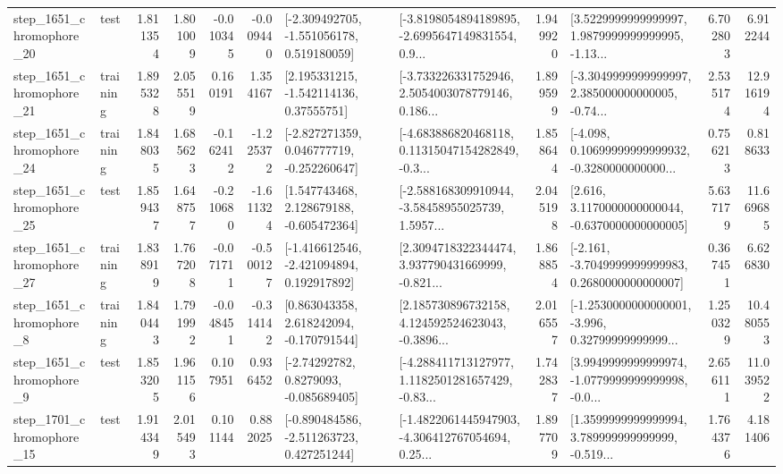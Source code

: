 \begin{tabular}{llrrrrllrlrr}
 step\_1651\_chromophore\_20 &      test &      1.811354 &    1.801009 &     -0.010345 & -0.009440 &   [-2.309492705, -1.551056178, 0.519180059] &  [-3.8198054894189895, -2.6995647149831554, 0.9... &       1.949920 &  [3.5229999999999997, 1.9879999999999995, -1.13... &            6.702803 &          6.912244 \\
 step\_1651\_chromophore\_21 &  training &      1.895328 &    2.055519 &      0.160191 &  1.354167 &     [2.195331215, -1.542114136, 0.37555751] &  [-3.733226331752946, 2.5054003078779146, 0.186... &       1.899599 &  [-3.3049999999999997, 2.385000000000005, -0.74... &            2.535174 &         12.916194 \\
 step\_1651\_chromophore\_24 &  training &      1.848035 &    1.685623 &     -0.162412 & -1.225372 &   [-2.827271359, 0.046777719, -0.252260647] &  [-4.683886820468118, 0.11315047154282849, -0.3... &       1.858644 &  [-4.098, 0.10699999999999932, -0.3280000000000... &            0.756213 &          0.818633 \\
 step\_1651\_chromophore\_25 &      test &      1.859437 &    1.648757 &     -0.210680 & -1.611324 &    [1.547743468, 2.128679188, -0.605472364] &  [-2.588168309910944, -3.58458955025739, 1.5957... &       2.045198 &   [2.616, 3.1170000000000044, -0.6370000000000005] &            5.637179 &         11.669685 \\
 step\_1651\_chromophore\_27 &  training &      1.838919 &    1.767208 &     -0.071711 & -0.500127 &   [-1.416612546, -2.421094894, 0.192917892] &  [2.3094718322344474, 3.937790431669999, -0.821... &       1.868854 &  [-2.161, -3.7049999999999983, 0.2680000000000007] &            0.367451 &          6.626830 \\
  step\_1651\_chromophore\_8 &  training &      1.840443 &    1.791992 &     -0.048451 & -0.314142 &    [0.863043358, 2.618242094, -0.170791544] &  [2.185730896732158, 4.124592524623043, -0.3896... &       2.016557 &  [-1.2530000000000001, -3.996, 0.32799999999999... &            1.250329 &         10.480553 \\
  step\_1651\_chromophore\_9 &      test &      1.853205 &    1.961156 &      0.107951 &  0.936452 &      [-2.74292782, 0.8279093, -0.085689405] &  [-4.288411713127977, 1.1182501281657429, -0.83... &       1.742837 &  [3.9949999999999974, -1.0779999999999998, -0.0... &            2.656111 &         11.039522 \\
 step\_1701\_chromophore\_15 &      test &      1.914349 &    2.015493 &      0.101144 &  0.882025 &   [-0.890484586, -2.511263723, 0.427251244] &  [-1.4822061445947903, -4.306412767054694, 0.25... &       1.897709 &  [1.3599999999999994, 3.789999999999999, -0.519... &            1.764376 &          4.181406 \\

\end{tabular}

